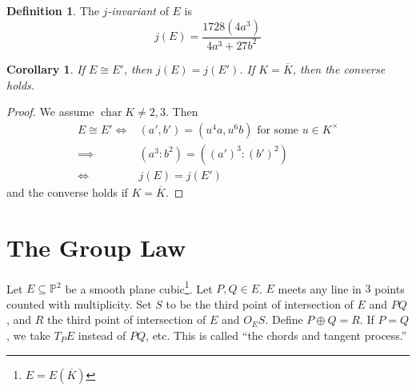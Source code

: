 \documentclass[11pt]{article}
\theoremstyle{definition}
\newtheorem*{definition*}{Definition}
\theoremstyle{plain}
\newtheorem{corollary}[definition]{Corollary}
\theoremstyle{remark}
\DeclareMathOperator{\Char}{char}
\newcommand{\PP}{\mathbb{P}}
\begin{document}
\begin{definition*}
    The \emph{$j$-invariant} of $E$ is
    \begin{equation*}
        j(E) = \frac{1728(4a^3)}{4a^3 + 27 b^2}
    \end{equation*}
\end{definition*}

\begin{corollary}\label{cor:3_4}
    If $E \cong E'$, then $j(E) = j(E')$. If $K = \overline{K}$, then the converse holds.
\end{corollary}
\begin{proof}
    We assume $\Char K \neq 2,3$. Then
    \begin{align*}
        E \cong E'
        \iff& (a', b') = (u^4 a, u^6 b) \text{ for some } u \in K^\times\\
        \implies& (a^3 : b^2) = ((a')^3 : (b')^2)\\
        \iff& j(E) = j(E')
    \end{align*}
    and the converse holds if $K = \overline{K}$.
\end{proof}

\section{The Group Law}

Let $E \subseteq \PP^2$ be a smooth plane cubic\footnote{$E = E(\overline{K})$}. Let $P, Q \in E$. $E$ meets any line in $3$ points counted with multiplicity. Set $S$ to be the third point of intersection of $E$ and $PQ$, and $R$ the third point of intersection of $E$ and $O_E S$. Define $P \oplus Q = R$. If $P = Q$, we take $T_P E$ instead of $PQ$, etc. This is called ``the chords and tangent process.''

\begin{figure}[H]
\centering
{}
\end{figure}
\end{document}

